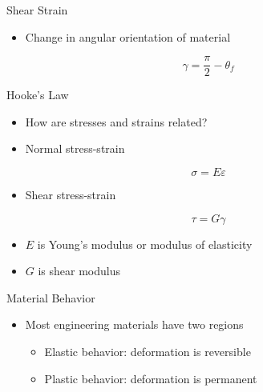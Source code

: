 \documentclass[10pt, svgnames]{beamer}
\begin{document}
\begin{frame}[label={sec:orgc9f738a}]{Shear Strain}
\begin{itemize}
\item Change in angular orientation of material
\end{itemize}

\[\gamma = \frac{\pi}{2} - \theta_f\]
\end{frame}

\begin{frame}[label={sec:orge7a00b2}]{Hooke's Law}
\begin{itemize}
\item How are stresses and strains related?

\item Normal stress-strain
\end{itemize}

\[\sigma = E \varepsilon\]

\begin{itemize}
\item Shear stress-strain
\end{itemize}

\[\tau = G \gamma\]

\begin{itemize}
\item \(E\) is Young's modulus or modulus of elasticity

\item \(G\) is shear modulus
\end{itemize}
\end{frame}

\begin{frame}[label={sec:org347ad18}]{Material Behavior}
\begin{itemize}
\item Most engineering materials have two regions

\begin{itemize}
\item Elastic behavior: deformation is reversible

\item Plastic behavior: deformation is permanent
\end{itemize}
\end{itemize}
\end{frame}
\end{document}
